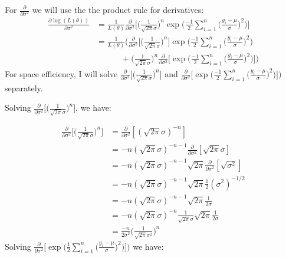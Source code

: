 For $\frac{\partial}{\partial\sigma^2}$ we will use the the product rule for derivatives:
\begin{align}
    \label{product_rule}
    \frac{\partial \log(L(\theta))}{\partial \sigma^2} 
    &= \frac{1}{L(\theta)}\frac{\partial}{\partial \sigma^2}\Big[\Big(\frac{1}{\sqrt{2\pi}\sigma}\Big)^n \exp\Big(\frac{-1}{2}\sum_{i=1}^n \Big(\frac{y_i - \mu}{\sigma}\Big)^2 \Big)\Big]\nonumber\\ 
    &=\frac{1}{L(\theta)}\Big(\frac{\partial}{\partial \sigma^2}\Big[\Big(\frac{1}{\sqrt{2\pi}\sigma}\Big)^n\Big] 
                                                                \exp\Big(\frac{-1}{2}\sum_{i=1}^n \Big(\frac{y_i - \mu}{\sigma}\Big)^2 \Big) \nonumber\\
    &\qquad\quad+
                                \Big(\frac{1}{\sqrt{2\pi}\sigma}\Big)^n 
                            \frac{\partial}{\partial \sigma^2}\Big[\exp\Big(\frac{-1}{2}\sum_{i=1}^n \Big(\frac{y_i - \mu}{\sigma}\Big)^2 \Big)\Big]\Big)
\end{align}
For space efficiency, I will solve $\frac{\partial}{\partial \sigma^2}\Big[\Big(\frac{1}{\sqrt{2\pi}\sigma}\Big)^n\Big]$ and 
                            $\frac{\partial}{\partial \sigma^2}\Big[\exp\Big(\frac{-1}{2}\sum_{i=1}^n \Big(\frac{y_i - \mu}{\sigma}\Big)^2 \Big)\Big]\Big)$
                            separately.

Solving $\frac{\partial}{\partial \sigma^2}\Big[\Big(\frac{1}{\sqrt{2\pi}\sigma}\Big)^n\Big]$, we have:

\begin{align}
    \label{product_left}
    \frac{\partial}{\partial \sigma^2}\Big[\Big(\frac{1}{\sqrt{2\pi}\sigma}\Big)^n\Big]
        &=\frac{\partial}{\partial \sigma^2}[(\sqrt{2\pi}\sigma)^{-n}]\nonumber\\
        &= -n(\sqrt{2\pi}\sigma)^{-n-1}\frac{\partial}{\partial \sigma^2}[\sqrt{2\pi}\sigma]\nonumber\\
        &= -n(\sqrt{2\pi}\sigma)^{-n-1}\sqrt{2\pi}\frac{\partial}{\partial \sigma^2}[\sqrt{\sigma^2}]\nonumber\\
        &= -n(\sqrt{2\pi}\sigma)^{-n-1}\sqrt{2\pi}\frac{1}{2}(\sigma^2)^{-1/2}\nonumber\\
        &= -n(\sqrt{2\pi}\sigma)^{-n-1}\sqrt{2\pi}\frac{1}{2\sigma}\nonumber\\
        &=-n(\sqrt{2\pi}\sigma)^{-n}\frac{1}{\sqrt{2\pi}\sigma}\sqrt{2\pi}\frac{1}{2\sigma}\nonumber\\
        &=\frac{-n}{2\sigma^2}\Big(\frac{1}{\sqrt{2\pi}\sigma^2}\Big)^{n}
\end{align}
Solving $\frac{\partial}{\partial \sigma^2}\Big[\exp\Big(\frac{1}{2}\sum_{i=1}^n \Big(\frac{y_i - \mu}{\sigma}\Big)^2 \Big)\Big]\Big)$ we have:

